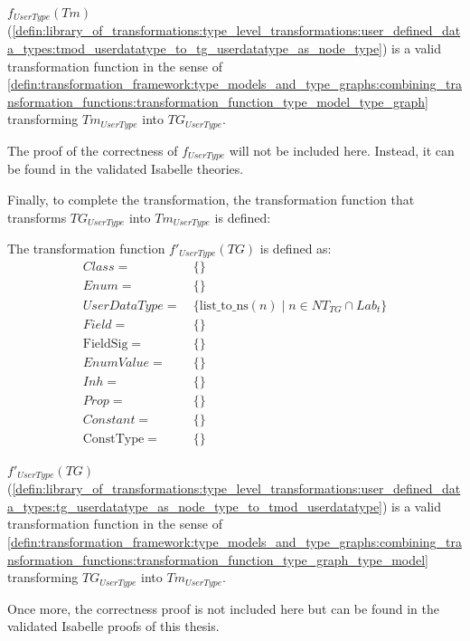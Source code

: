 \begin{thm}
\label{defin:library_of_transformations:type_level_transformations:user_defined_data_types:tmod_userdatatype_to_tg_userdatatype_as_node_type_func}
$f_{UserType}(Tm)$ (\cref{defin:library_of_transformations:type_level_transformations:user_defined_data_types:tmod_userdatatype_to_tg_userdatatype_as_node_type}) is a valid transformation function in the sense of \cref{defin:transformation_framework:type_models_and_type_graphs:combining_transformation_functions:transformation_function_type_model_type_graph} transforming $Tm_{UserType}$ into $TG_{UserType}$.
\end{thm}

The proof of the correctness of $f_{UserType}$ will not be included here. Instead, it can be found in the validated Isabelle theories.

Finally, to complete the transformation, the transformation function that transforms $TG_{UserType}$ into $Tm_{UserType}$ is defined:

\begin{defin}
\label{defin:library_of_transformations:type_level_transformations:user_defined_data_types:tg_userdatatype_as_node_type_to_tmod_userdatatype}
The transformation function $f'_{UserType}(TG)$ is defined as:
\begin{align*}
Class =\ &\{\} \\
Enum =\ &\{\} \\
UserDataType =\ &\{\mathrm{list\_\!to\_\!ns}(n) \mid n \in NT_{TG} \cap Lab_t \} \\
Field =\ &\{\} \\
\mathrm{FieldSig} =\ &\{\} \\
EnumValue =\ &\{\} \\
Inh =\ &\{\} \\
Prop =\ &\{\} \\
Constant =\ &\{\} \\
\mathrm{ConstType} =\ &\{\}
\end{align*}
\end{defin}

\begin{thm}
\label{defin:library_of_transformations:type_level_transformations:user_defined_data_types:tg_userdatatype_as_node_type_to_tmod_userdatatype_func}
$f'_{UserType}(TG)$ (\cref{defin:library_of_transformations:type_level_transformations:user_defined_data_types:tg_userdatatype_as_node_type_to_tmod_userdatatype}) is a valid transformation function in the sense of \cref{defin:transformation_framework:type_models_and_type_graphs:combining_transformation_functions:transformation_function_type_graph_type_model} transforming $TG_{UserType}$ into $Tm_{UserType}$.
\end{thm}

Once more, the correctness proof is not included here but can be found in the validated Isabelle proofs of this thesis.